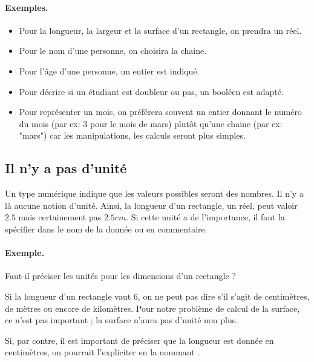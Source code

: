 		\begin{Emphase}
			\paragraph{Exemples.}	
			\begin{itemize}
			\item Pour la longueur, la largeur et la surface d'un rectangle, on prendra un réel.
			\item Pour le nom d'une personne, on choisira la chaine.
			\item Pour l'âge d'une personne, un entier est indiqué.
			\item Pour décrire si un étudiant est doubleur ou pas, un booléen est adapté.
			\item Pour représenter un mois, on préférera souvent un entier
				donnant le numéro du mois (par ex: 3 pour le mois de mars)
				plutôt qu'une chaine (par ex: "mars")
				car les manipulations, les calculs seront plus simples.
			\end{itemize}
		\end{Emphase}
	
		\subsection{Il n'y a pas d'unité}
	
			Un type numérique indique que les valeurs possibles seront
			des nombres. Il n'y a là aucune notion d'unité.
			Ainsi, la longueur d'un rectangle, un réel, 
			peut valoir $2.5$ mais certainement pas $2.5 cm$.
			Si cette unité a de l'importance,
			il faut la spécifier dans le nom de la donnée ou en commentaire.
			
			\begin{Emphase}
				\paragraph{Exemple.}
				Faut-il préciser les unités 
				pour les dimensions d'un rectangle ?
				
				Si la longueur d'un rectangle vaut $6$, 
				on ne peut pas dire s'il s'agit de centimètres, 
				de mètres ou encore de kilomètres.
				Pour notre problème de calcul de la surface,
				ce n'est pas important ;
				la surface n'aura pas d'unité non plus.
				
				Si, par contre, 
				il est important de préciser que la longueur
				est donnée en centimètres,
				on pourrait l'expliciter en la nommant
				.	
			\end{Emphase}
	
